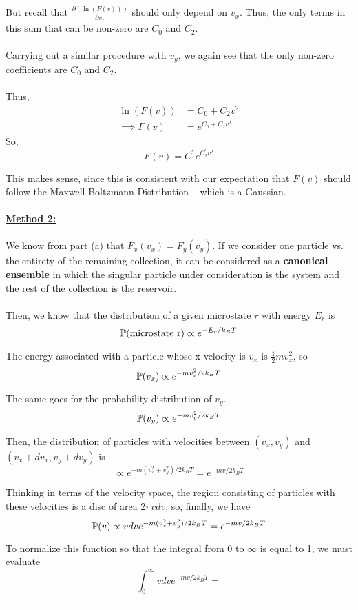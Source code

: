 \documentclass[twoside]{article}
\begin{document}
\begin{enumerate}[label=(\alph*)]
   But recall that $\frac{\partial (\ln(F(v)))}{\partial v_x}$ should only depend on $v_x$. Thus, the only terms in this sum that can be non-zero are $C_0$ and $C_2$. 
   \\
   \\
   Carrying out a similar procedure with $v_y$, we again see that the only non-zero coefficients are $C_0$ and $C_2$.
   \\
   \\
   Thus,
   \begin{align*}
      \ln(F(v)) &= C_0 + C_2 v^2 \\
      \implies F(v) &= e^{C_0 + C_2 v^2}
   \end{align*}
   So,
   \[ \boxed{F(v) = C^{'}_1e^{C^{'}_2 v^2}} \]

   This makes sense, since this is consistent with our expectation that $F(v)$ should follow the Maxwell-Boltzmann Distribution -- which is a Gaussian.
   \\
   \\
   \underline{\textbf{Method 2:}}
   \\
   \\
   We know from part (a) that $F_x(v_x) = F_y(v_y)$. If we consider one particle vs. the entirety of the remaining collection, it can be considered as a \textbf{canonical ensemble} in which the singular particle under consideration is the system and the rest of the collection is the reservoir. 
   \\
   \\
   Then, we know that the distribution of a given microstate $r$ with energy $E_r$ is 
   \[ \mathbb{P}(\text{microstate r}) \propto e^{-E_r / k_B T} \]

   The energy associated with a particle whose x-velocity is $v_x$ is $\frac{1}{2}mv^2_x$, so 
   \[ \mathbb{P}(v_x) \propto e^{-mv^{2}_{x}/2k_B T}\]

   The same goes for the probability distribution of $v_y$.
   \[ \mathbb{P}(v_y) \propto e^{-mv^{2}_{y}/2k_B T} \]

   Then, the distribution of particles with velocities between $(v_x, v_y)$ and $(v_x + dv_x, v_y + dv_y)$ is 
   \[ \propto e^{-m(v_x^2 + v_y^2)/2k_B T} = e^{-mv/2k_B T} \]

   Thinking in terms of the velocity space, the region consisting of particles with these velocities is a disc of area $2\pi v dv$, so, finally, we have 
   \[ \mathbb{P}(v) \propto v dv e^{-m(v_x^2 + v_y^2)/2k_B T} = e^{-mv/2k_B T} \]

   To normalize this function so that the integral from $0$ to $\infty$ is equal to 1, we must evaluate 
   \[ \int_{0}^{\infty} v dv e^{-mv/2k_B T} = \]
   
\end{enumerate}
\vskip 0.25cm
\hrule
\vskip 1cm
\end{document}

